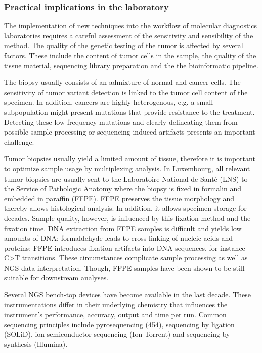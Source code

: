 {{    \subsubsection{Practical implications in the laboratory}

      The implementation of new techniques into the workflow of molecular
      diagnostics laboratories requires a careful assessment of the sensitivity
      and sensibility of the method. The quality of the genetic testing of the tumor is affected by several
      factors. These include the content of tumor cells in the sample, the
      quality of the tissue material, sequencing library preparation and the the
      bioinformatic pipeline.

      The biopsy usually consists of an admixture of normal and cancer cells.
      The sensitivity of tumor variant detection is linked to the tumor cell
      content of the specimen. In addition, cancers are highly heterogenous,
      e.g. a small subpopulation might present mutations that provide resistance
      to the treatment. Detecting these low-frequency mutations and clearly
      delineating them from possible sample processing or sequencing induced
      artifacts presents an important challenge.

      Tumor biopsies usually yield a limited amount of tissue, therefore it is
      important to optimize sample usage by multiplexing analysis. In
      Luxembourg, all relevant tumor biopsies are usually sent to the
      Laboratoire National de Santé (LNS) to the Service of Pathologic Anatomy
      where the biopsy is fixed in formalin and embedded in paraffin (FFPE).
      FFPE preserves the tissue morphology and thereby allows histological
      analysis. In addition, it allows specimen storage for decades. Sample
      quality, however, is influenced by this fixation method and the fixation
      time. DNA extraction from FFPE samples is difficult and yields low amounts
      of DNA; formaldehyde leads to cross-linking of nucleic acids and proteins;
      FFPE introduces fixation artifacts into DNA sequences, for instance C>T
      transitions. These circumstances complicate sample processing as well as
      NGS data interpretation. Though, FFPE samples have been shown to be still
      suitable for downstream analyses.

      Several NGS bench-top devices have become available in the last decade.
      These instrumentations differ in their underlying chemistry that
      influences the instrument’s performance, accuracy, output and time per
      run. Common sequencing principles include pyrosequencing (454), sequencing
      by ligation (SOLiD), ion semiconductor sequencing (Ion Torrent) and
      sequencing by synthesis (Illumina).

}}
